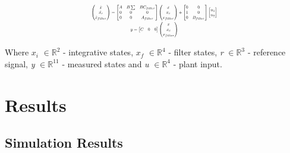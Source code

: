 \begin{equation}
\centering
\resizebox{0.44\textwidth}{!}{$
    \begin{gathered}
        \begin{pmatrix}
            \Dot{x} \\ \Dot{x_c} \\ \Dot{x}_{filter}
        \end{pmatrix} =
        \begin{bmatrix}
            A & B \sum & B C_{filter} \\
            0 & 0 & 0 \\
            0 & 0 & A_{filter} 
        \end{bmatrix}
        \begin{pmatrix}
            x \\ x_c \\ x_{filter}
        \end{pmatrix}
        +
        \begin{bmatrix}
            0 & 0 \\ 1 & 0 \\ 0 & B_{filter}
        \end{bmatrix}
        \begin{bmatrix}
            u_1 \\ u_2
        \end{bmatrix}  \\
        y = \begin{bmatrix}
            C & 0 & 0
        \end{bmatrix}
        \begin{pmatrix}
            x \\ x_c \\ x_{filter}
        \end{pmatrix}
    \end{gathered}$}
    \label{AugEq2}
\end{equation}

Where \textit{$x_i$} $\in \mathbb{R}^{2}$ - integrative states, \textit{$x_f$} $\in \mathbb{R}^{4}$ - filter states, \textit{r} $\in \mathbb{R}^{3}$ - reference signal, \textit{y} $\in \mathbb{R}^{11}$ - measured states and \textit{u} $\in \mathbb{R}^{4}$ - plant input.

\section{Results}

\subsection{Simulation Results}

